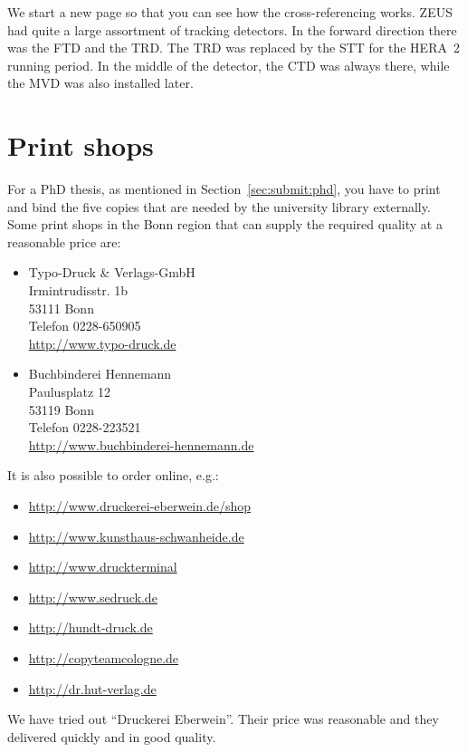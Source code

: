We start a new page so that you can see how the cross-referencing
works.  ZEUS had quite a large assortment of tracking detectors. In the
forward direction there was the \gls{FTD} and the \gls{TRD}. The
\gls{TRD} was replaced by the \gls{STT} for the HERA~2 running
period.  In the middle of the detector, the \gls{CTD} was always
there, while the \gls{MVD} was also installed later.


\chapter{Print shops}
\label{app:printer}

For a PhD thesis, as mentioned in Section~\ref{sec:submit:phd}, you
have to print and bind the five copies that are needed by the
university library externally. Some print shops in the Bonn region
that can supply the required quality at a reasonable price are:

\begin{itemize}
\item
Typo-Druck \& Verlags-GmbH\\
Irmintrudisstr. 1b\\
53111 Bonn\\
Telefon 0228-650905\\
\url{http://www.typo-druck.de}

\item
Buchbinderei Hennemann\\
Paulusplatz 12\\
53119 Bonn\\
Telefon 0228-223521\\
\url{http://www.buchbinderei-hennemann.de}

\end{itemize}

It is also possible to order online, e.g.:
\begin{itemize}
\item \url{http://www.druckerei-eberwein.de/shop}
\item \url{http://www.kunsthaus-schwanheide.de}
\item \url{http://www.druckterminal}
\item \url{http://www.sedruck.de}
\item \url{http://hundt-druck.de}
\item \url{http://copyteamcologne.de}
\item \url{http://dr.hut-verlag.de}
\end{itemize}
We have tried out \foreignquote{ngerman}{Druckerei Eberwein}. Their
price was reasonable and they delivered quickly and in good quality.

